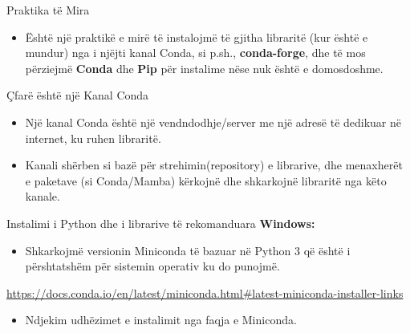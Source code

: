 \documentclass[
  ignorenonframetext,
]{beamer}
\providecommand{\tightlist}{%
  \setlength{\itemsep}{0pt}\setlength{\parskip}{0pt}}
\begin{document}
\begin{frame}{Praktika të Mira}
\protect\hypertarget{praktika-tuxeb-mira}{}
\begin{itemize}
\tightlist
\item
  Është një praktikë e mirë të instalojmë të gjitha libraritë (kur është
  e mundur) nga i njëjti kanal Conda, si p.sh., \textbf{conda-forge},
  dhe të mos përziejmë \textbf{Conda} dhe \textbf{Pip} për instalime
  nëse nuk është e domosdoshme.
\end{itemize}
\end{frame}

\begin{frame}{Çfarë është një Kanal Conda}
\protect\hypertarget{uxe7faruxeb-uxebshtuxeb-njuxeb-kanal-conda}{}
\begin{itemize}
\item
  Një kanal Conda është një vendndodhje/server me një adresë të dedikuar
  në internet, ku ruhen libraritë.
\item
  Kanali shërben si bazë për strehimin(repository) e librarive, dhe
  menaxherët e paketave (si Conda/Mamba) kërkojnë dhe shkarkojnë
  libraritë nga këto kanale.
\end{itemize}
\end{frame}

\begin{frame}{Instalimi i Python dhe i librarive të rekomanduara}
\protect\hypertarget{instalimi-i-python-dhe-i-librarive-tuxeb-rekomanduara}{}
\textbf{Windows:}

\begin{itemize}
\tightlist
\item
  Shkarkojmë versionin Miniconda të bazuar në Python 3 që është i
  përshtatshëm për sistemin operativ ku do punojmë.
\end{itemize}

\url{https://docs.conda.io/en/latest/miniconda.html\#latest-miniconda-installer-links}

\begin{itemize}
\tightlist
\item
  Ndjekim udhëzimet e instalimit nga faqja e Miniconda.
\end{itemize}
\end{frame}
\end{document}
